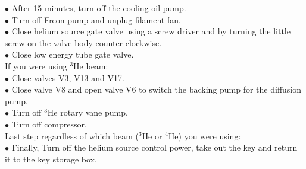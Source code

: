 \documentclass{article}
\begin{document}
$\bullet$ After 15 minutes, turn off the cooling oil pump.\\
$\bullet$ Turn off Freon pump and unplug filament fan.\\
$\bullet$ Close helium source gate valve using a screw driver and by turning the little screw on the valve body counter clockwise.\\
$\bullet$ Close low energy tube gate valve.\\
If you were using $^{3}$He beam:\\
$\bullet$ Close valves V3, V13 and V17.\\
$\bullet$ Close valve V8 and open valve V6 to switch the backing pump for the diffusion pump.\\
$\bullet$ Turn off $^{3}$He rotary vane pump.\\
$\bullet$ Turn off compressor.\\
Last step regardless of which beam ($^{3}$He or $^{4}$He) you were using:\\
$\bullet$ Finally, Turn off the helium source control power, take out the key and return it to the key storage box.
\end{document}
